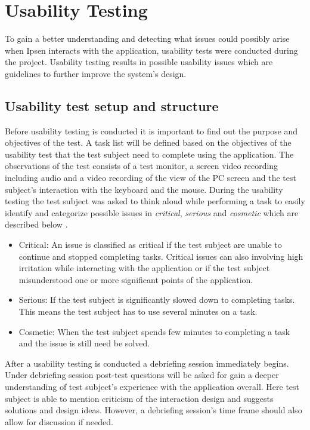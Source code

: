 \section{Usability Testing} \label{sec:usabilitytesting}

To gain a better understanding and detecting what issues could possibly arise when Ipsen interacts with the application, usability tests were conducted during the project.
Usability testing results in possible usability issues which are guidelines to further improve the system's design.

\subsection{Usability test setup and structure}
Before usability testing is conducted it is important to find out the purpose and objectives of the test.
A task list will be defined based on the objectives of the usability test that the test subject need to complete using the application. The observations of the test consists of a test monitor, a screen video recording including audio and a video recording of the view of the PC screen and the test subject's interaction with the keyboard and the mouse.
During the usability testing the test subject was asked to think aloud while performing a task to easily identify and categorize possible issues in \textit{critical}, \textit{serious} and \textit{cosmetic} which are described below \citep[p.~154]{brugervenligtwebdesign}.

\begin{itemize}
  \item Critical: An issue is classified as critical if the test subject are unable to continue and stopped completing tasks.
Critical issues can also involving high irritation while interacting with the application or if the test subject misunderstood one or more significant points of the application.
  \item Serious: If the test subject is significantly slowed down to completing tasks.
This means the test subject has to use several minutes on a task.
	\item Cosmetic: When the test subject spends few minutes to completing a task and the issue is still need be solved.
\end{itemize}

After a usability testing is conducted a debriefing session immediately  begins.
Under debriefing session post-test questions will be asked for gain a deeper understanding of test subject's experience with the application overall.
Here test subject is able to mention criticism of the interaction design and suggests solutions and design ideas.
However, a debriefing session's time frame should also allow for discussion if needed.

